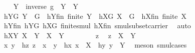 \begin{isabellebody}
\ \ \isamarkupfalse%
\ {\isacharquery}{\kern0pt}Y{}\ {\isacharequal}{\kern0pt}\ {\isachardoublequoteopen}{\isacharparenleft}{\kern0pt}{\isacharbraceleft}{\kern0pt}inverse\ g{\isacharbraceright}{\kern0pt}\ {\isasymcdots}\ Y{\isacharparenright}{\kern0pt}\ {\isasyminter}\ Y{\isachardoublequoteclose}\isanewline
\ \ \isamarkupfalse%
\ hY{}G{\isacharcolon}{\kern0pt}\ {\isachardoublequoteopen}{\isacharquery}{\kern0pt}Y{}\ {\isasymsubseteq}\ G{\isachardoublequoteclose}\ \ hY{}fin{\isacharcolon}{\kern0pt}\ {\isachardoublequoteopen}finite\ {\isacharquery}{\kern0pt}Y{}{\isachardoublequoteclose}\ \ hX{}G{\isacharcolon}{\kern0pt}\ {\isachardoublequoteopen}{\isacharquery}{\kern0pt}X{}\ {\isasymsubseteq}\ G{\isachardoublequoteclose}\ \ hX{}fin{\isacharcolon}{\kern0pt}\ {\isachardoublequoteopen}finite\ {\isacharquery}{\kern0pt}X{}{\isachardoublequoteclose}\ \isanewline
\ \ \ \ \isamarkupfalse%
\ hYfin\ hYG\ hXG\ finite{\isacharunderscore}{\kern0pt}smul\ hXfin\ smul{\isacharunderscore}{\kern0pt}subset{\isacharunderscore}{\kern0pt}carrier\ \isamarkupfalse%
\ auto\isanewline
\ \ \isamarkupfalse%
\ hXY{}{\isacharcolon}{\kern0pt}\ {\isachardoublequoteopen}{\isacharquery}{\kern0pt}X{}\ {\isasymcdots}\ {\isacharquery}{\kern0pt}Y{}\ {\isasymsubseteq}\ X\ {\isasymcdots}\ Y{\isachardoublequoteclose}\isanewline
\ \ \isamarkupfalse%
\isanewline
\ \ \ \ \isamarkupfalse%
\ z\ \isamarkupfalse%
\ {\isachardoublequoteopen}z\ {\isasymin}\ {\isacharquery}{\kern0pt}X{}\ {\isasymcdots}\ {\isacharquery}{\kern0pt}Y{}{\isachardoublequoteclose}\isanewline
\ \ \ \ \isamarkupfalse%
\ \isamarkupfalse%
\ x\ y\ \ hz{\isacharcolon}{\kern0pt}\ {\isachardoublequoteopen}z\ {\isacharequal}{\kern0pt}\ x\ {\isasymcdot}\ y{\isachardoublequoteclose}\ \ hx{\isacharcolon}{\kern0pt}\ {\isachardoublequoteopen}x\ {\isasymin}\ {\isacharquery}{\kern0pt}X{}{\isachardoublequoteclose}\ \ hy{\isacharcolon}{\kern0pt}\ {\isachardoublequoteopen}y\ {\isasymin}\ {\isacharquery}{\kern0pt}Y{}{\isachardoublequoteclose}\ \isamarkupfalse%
\ {\isacharparenleft}{\kern0pt}meson\ smul{\isachardot}{\kern0pt}cases{\isacharparenright}{\kern0pt}\isanewline
\ \ \ \ \isamarkupfalse%

\end{isabellebody}
